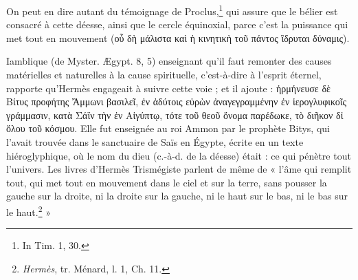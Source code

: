 \documentclass[a4paper, 11pt, oneside]{article}
\begin{document}
On peut en dire autant du témoignage de Proclus,\footnote{In Tim. 1, 30.} qui assure que le bélier est consacré à cette déesse, ainsi que le cercle équinoxial, parce c'est la puissance qui met tout en mouvement (οὗ δὴ μάλιστα καὶ ἡ κινητικὴ τοῦ πάντος ἳδρυται δύναμις).

Iamblique (de Myster. Ægypt. 8, 5) enseignant qu'il faut remonter des causes matérielles et naturelles à la cause spirituelle, c'est-à-dire à l'esprit éternel, rapporte qu'Hermès engageait à suivre cette voie ; et il ajoute : ἡρμήνευσε δὲ Βίτυς προφήτης Ἄμμωνι βασιλεῖ, ἐν ἀδύτοις εὑρὼν ἀναγεγραμμένην ἐν ἱερογλυφικοῖς γράμμασιν, κατὰ Σάϊν τὴν ἐν Αἰγύπτῳ, τότε τοῦ θεοῦ ὄνομα παρέδωκε, τὸ διῆκον δἰ ὅλου τοῦ κόσμου. Elle fut enseignée au roi Ammon par le prophète Bitys, qui l'avait trouvée dans le sanctuaire de Saïs en Égypte, écrite en un texte hiéroglyphique, où le nom du dieu (c.-à-d. de la déesse) était : ce qui pénètre tout l'univers. Les livres d'Hermès Trismégiste parlent de même de « l'âme qui remplit tout, qui met tout en mouvement dans le ciel et sur la terre, sans pousser la gauche sur la droite, ni la droite sur la gauche, ni le haut sur le bas, ni le bas sur le haut.\footnote{\emph{Hermès}, tr. Ménard, l. 1, Ch. 11.} »
\end{document}
